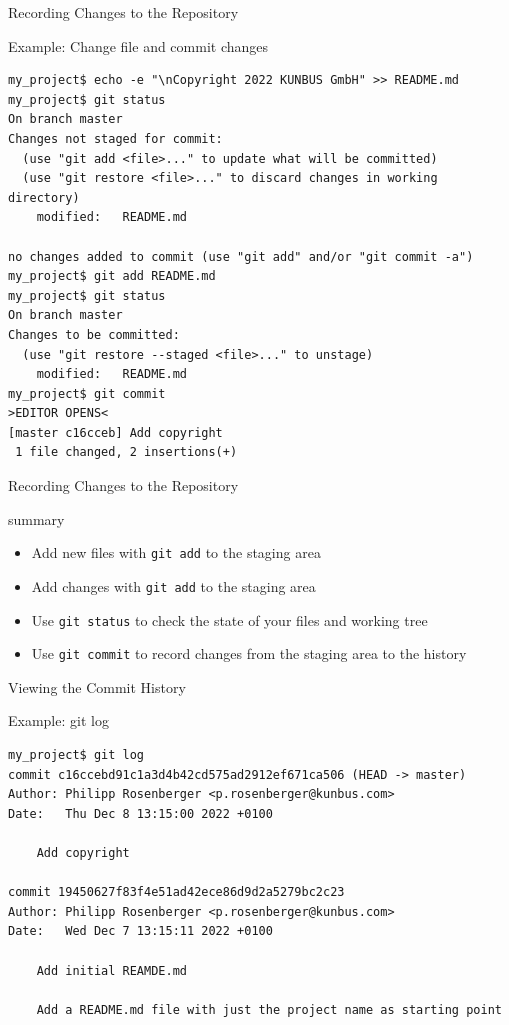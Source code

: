 \documentclass[aspectratio=169]{beamer}
\renewcommand{\footnotesize}{\tiny}
\newcommand{\sectiontitle}{}
\begin{document}
\begin{frame}[fragile]{Recording Changes to the Repository}{\sectiontitle}
\begin{block}{Example: Change file and commit changes}
\begin{verbatim}
my_project$ echo -e "\nCopyright 2022 KUNBUS GmbH" >> README.md
my_project$ git status
On branch master
Changes not staged for commit:
  (use "git add <file>..." to update what will be committed)
  (use "git restore <file>..." to discard changes in working directory)
    modified:   README.md

no changes added to commit (use "git add" and/or "git commit -a")
my_project$ git add README.md
my_project$ git status 
On branch master
Changes to be committed:
  (use "git restore --staged <file>..." to unstage)
    modified:   README.md
my_project$ git commit
>EDITOR OPENS<
[master c16cceb] Add copyright
 1 file changed, 2 insertions(+)
\end{verbatim}
\end{block}
\end{frame}

\begin{frame}[fragile]{Recording Changes to the Repository}{\sectiontitle}
\begin{block}{summary}
\begin{itemize}
    \item Add new files with \verb|git add| to the staging area
    \item Add changes with \verb|git add| to the staging area
    \item Use \verb|git status| to check the state of your files and working tree
    \item Use \verb|git commit| to record changes from the staging area to the history
\end{itemize}
\end{block}
\end{frame}

\begin{frame}[fragile]{Viewing the Commit History}{\sectiontitle}
\begin{block}{Example: \ttfamily git log}
\begin{verbatim}
my_project$ git log
commit c16ccebd91c1a3d4b42cd575ad2912ef671ca506 (HEAD -> master)
Author: Philipp Rosenberger <p.rosenberger@kunbus.com>
Date:   Thu Dec 8 13:15:00 2022 +0100

    Add copyright

commit 19450627f83f4e51ad42ece86d9d2a5279bc2c23
Author: Philipp Rosenberger <p.rosenberger@kunbus.com>
Date:   Wed Dec 7 13:15:11 2022 +0100

    Add initial REAMDE.md
    
    Add a README.md file with just the project name as starting point

\end{verbatim}
\end{block}
\end{frame}
\end{document}
